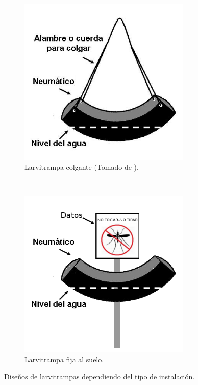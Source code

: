 \begin{figure}[!htbp]
    \centering
    \begin{subfigure}[b]{0.45\textwidth}
        \includegraphics[width=0.9\textwidth]{anexos/graphics/disenho-1.png}
        \caption{\label{fig:anexo-disenho-1} Larvitrampa colgante (Tomado de \cite{manualControlArg2009}).}
    \end{subfigure}
    ~~~~
    \begin{subfigure}[b]{0.45\textwidth}
        \includegraphics[width=0.9\textwidth]{anexos/graphics/disenho-2.png}
        \caption{\label{fig:anexo-disenho-2} Larvitrampa fija al suelo.}
    \end{subfigure}
    \caption{\label{fig:disenhos-larvitrampas} Diseños de larvitrampas dependiendo del tipo de instalación.}
\end{figure}

